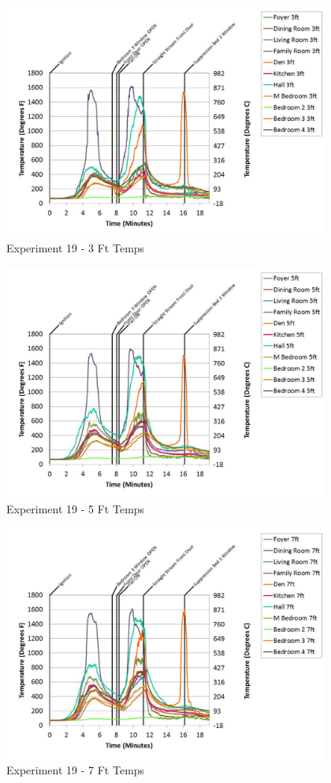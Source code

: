 \documentclass{article}
\begin{document}
\begin{appendices}
	\begin{figure}[h!]
		\centering
		\includegraphics[height=3.05in]{0_Images/Results_Charts/Exp_19_Charts/3FtTemps.pdf}
		\caption{Experiment 19 - 3 Ft Temps}
	\end{figure}
 
	\clearpage

	\begin{figure}[h!]
		\centering
		\includegraphics[height=3.05in]{0_Images/Results_Charts/Exp_19_Charts/5FtTemps.pdf}
		\caption{Experiment 19 - 5 Ft Temps}
	\end{figure}
 

	\begin{figure}[h!]
		\centering
		\includegraphics[height=3.05in]{0_Images/Results_Charts/Exp_19_Charts/7FtTemps.pdf}
		\caption{Experiment 19 - 7 Ft Temps}
	\end{figure}
 

\end{appendices}
\end{document}
